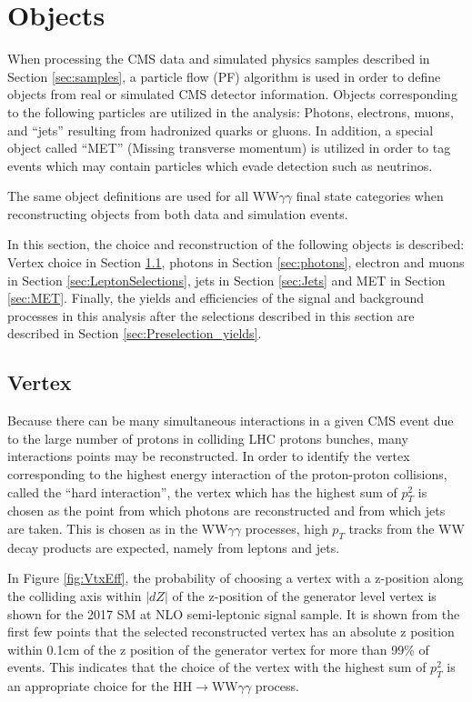 \section{Objects} \label{sec:Objects}

When processing the CMS data and simulated physics samples described in Section \ref{sec:samples}, a particle flow (PF) \cite{CMS:2017yfk} algorithm is used in order to define objects from real or simulated CMS detector information. Objects corresponding to the following particles are utilized in the analysis: Photons, electrons, muons, and ``jets'' resulting from hadronized quarks or gluons. In addition, a special object called ``MET'' (Missing transverse momentum) is utilized in order to tag events which may contain particles which evade detection such as neutrinos. 

The same object definitions are used for all WW$\gamma\gamma$ final state categories when reconstructing objects from both data and simulation events.

In this section, the choice and reconstruction of the following objects is described: Vertex choice in Section \ref{sec:vertex}, photons in Section \ref{sec:photons}, electron and muons in Section \ref{sec:LeptonSelections}, jets in Section \ref{sec:Jets} and MET in Section \ref{sec:MET}. Finally, the yields and efficiencies of the signal and background processes in this analysis after the selections described in this section are described in Section \ref{sec:Preselection_yields}.

\subsection{Vertex} \label{sec:vertex}

Because there can be many simultaneous interactions in a given CMS event due to the large number of protons in colliding LHC protons bunches, many interactions points may be reconstructed. In order to identify the vertex corresponding to the highest energy interaction of the proton-proton collisions, called the ``hard interaction'', the vertex which has the highest sum of $p_{T}^{2}$ is chosen as the point from which photons are reconstructed and from which jets are taken. This is chosen as in the WW$\gamma\gamma$ processes, high $p_{T}$ tracks from the WW decay products are expected, namely from leptons and jets.

In Figure \ref{fig:VtxEff}, the probability of choosing a vertex with a z-position along the colliding axis within $|dZ|$ of the z-position of the generator level vertex is shown for the 2017 SM at NLO semi-leptonic signal sample. It is shown from the first few points
that the selected reconstructed vertex has an absolute z position within 0.1cm of the z position of the generator vertex for more than 99\% of events. This indicates that the choice of the vertex with the highest sum of $p_{T}^{2}$ is an appropriate choice for the HH$\rightarrow$WW$\gamma\gamma$ process. 

